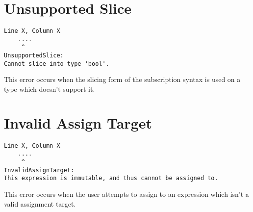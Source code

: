 \section{Unsupported Slice}
\begin{lstlisting}[breaklines]
Line X, Column X
    ....
     ^
UnsupportedSlice:
Cannot slice into type 'bool'.
\end{lstlisting}

This error occurs when the slicing form of the subscription syntax is used on a
type which doesn't support it.

\section{Invalid Assign Target}
\begin{lstlisting}[breaklines]
Line X, Column X
    ....
     ^
InvalidAssignTarget:
This expression is immutable, and thus cannot be assigned to.
\end{lstlisting}

This error occurs when the user attempts to assign to an expression which isn't
a valid assignment target.
